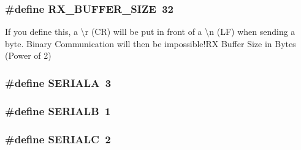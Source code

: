 \subsubsection[{R\+X\+\_\+\+B\+U\+F\+F\+E\+R\+\_\+\+S\+I\+Z\+E}]{\setlength{\rightskip}{0pt plus 5cm}\#define R\+X\+\_\+\+B\+U\+F\+F\+E\+R\+\_\+\+S\+I\+Z\+E~32}\label{group__uart_ga739a2a1a0047c98ac1b18ecd25dac092}
If you define this, a \textquotesingle{}\textbackslash{}r\textquotesingle{} (C\+R) will be put in front of a \textquotesingle{}\textbackslash{}n\textquotesingle{} (L\+F) when sending a byte. Binary Communication will then be impossible!\+R\+X Buffer Size in Bytes (Power of 2) \hypertarget{group__uart_gaa5bea8111e1e8e5aecf47e828e49ffd4}{}
\subsubsection[{S\+E\+R\+I\+A\+L\+A}]{\setlength{\rightskip}{0pt plus 5cm}\#define S\+E\+R\+I\+A\+L\+A~3}\label{group__uart_gaa5bea8111e1e8e5aecf47e828e49ffd4}
\hypertarget{group__uart_gabcb483ebd1a604344646038d126a7275}{}
\subsubsection[{S\+E\+R\+I\+A\+L\+B}]{\setlength{\rightskip}{0pt plus 5cm}\#define S\+E\+R\+I\+A\+L\+B~1}\label{group__uart_gabcb483ebd1a604344646038d126a7275}
\hypertarget{group__uart_gaa077cc918060f1067f5c2789b9a19254}{}
\subsubsection[{S\+E\+R\+I\+A\+L\+C}]{\setlength{\rightskip}{0pt plus 5cm}\#define S\+E\+R\+I\+A\+L\+C~2}\label{group__uart_gaa077cc918060f1067f5c2789b9a19254}
\hypertarget{group__uart_gaa51318345d7d41d395a6db8484b3ffdd}{}
